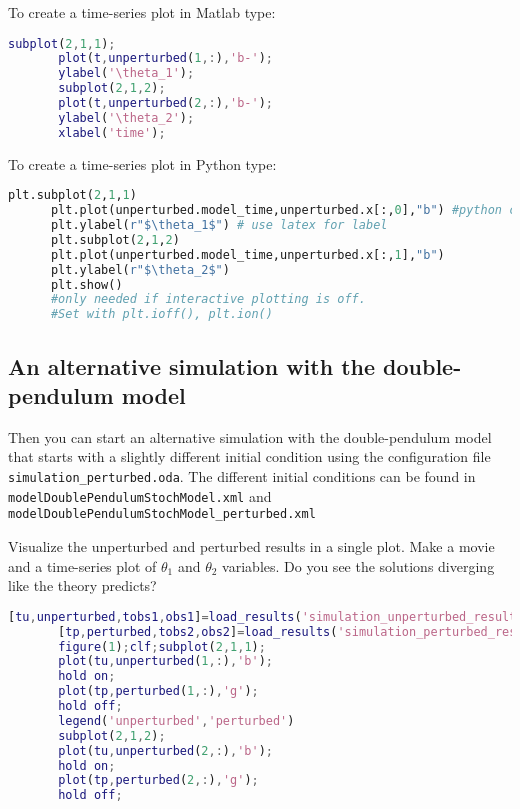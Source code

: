 \ifshowmatlab
      To create a time-series plot in Matlab type:
      \begin{lstlisting}[language=Matlab,frame=single,caption={Matlab}]
       subplot(2,1,1);
       plot(t,unperturbed(1,:),'b-');
       ylabel('\theta_1');
       subplot(2,1,2);
       plot(t,unperturbed(2,:),'b-');
       ylabel('\theta_2');
       xlabel('time');
      \end{lstlisting}
\fi
      
      To create a time-series plot in Python type:
      \begin{lstlisting}[language=Python,frame=single,caption={Python}]
      plt.subplot(2,1,1)
      plt.plot(unperturbed.model_time,unperturbed.x[:,0],"b") #python counts starting at 0
      plt.ylabel(r"$\theta_1$") # use latex for label
      plt.subplot(2,1,2)
      plt.plot(unperturbed.model_time,unperturbed.x[:,1],"b")
      plt.ylabel(r"$\theta_2$")
      plt.show() 
      #only needed if interactive plotting is off. 
      #Set with plt.ioff(), plt.ion()
      \end{lstlisting}
%
\subsection{An alternative simulation with the double-pendulum model}

Then you can start an alternative simulation with the double-pendulum model that
       starts with a slightly different initial condition using the
       configuration file \texttt{ simulation\_perturbed.oda}. The different initial conditions
       can be found in \texttt{model\/DoublePendulumStochModel.xml} and \\
       \texttt{model\/DoublePendulumStochModel\_perturbed.xml}

Visualize the unperturbed and perturbed results in a single plot. Make
       a movie and a time-series plot of $\theta_1$ and $\theta_2$ variables. Do you see
       the solutions diverging like the theory predicts?
       
\ifshowmatlab
      \begin{lstlisting}[language=Matlab,frame=single,caption={Matlab}]
       [tu,unperturbed,tobs1,obs1]=load_results('simulation_unperturbed_results');
       [tp,perturbed,tobs2,obs2]=load_results('simulation_perturbed_results');
       figure(1);clf;subplot(2,1,1);
       plot(tu,unperturbed(1,:),'b');
       hold on;
       plot(tp,perturbed(1,:),'g');
       hold off;
       legend('unperturbed','perturbed')
       subplot(2,1,2);
       plot(tu,unperturbed(2,:),'b');
       hold on;
       plot(tp,perturbed(2,:),'g');
       hold off;
      \end{lstlisting}
\fi
      

